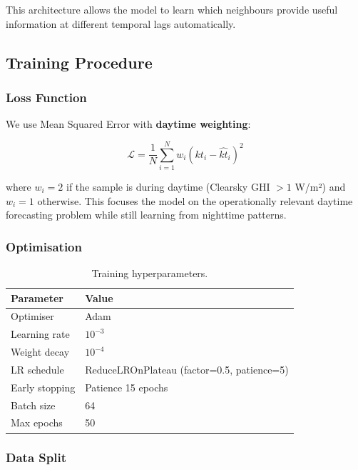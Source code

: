 \documentclass[11pt,a4paper]{article}
\begin{document}
This architecture allows the model to learn which neighbours provide useful information at different temporal lags automatically.

\subsection{Training Procedure}

\subsubsection{Loss Function}

We use Mean Squared Error with \textbf{daytime weighting}:

\begin{equation}
    \mathcal{L} = \frac{1}{N} \sum_{i=1}^{N} w_i (kt_i - \hat{kt}_i)^2
\end{equation}

where $w_i = 2$ if the sample is during daytime (Clearsky GHI $> 1$ W/m²) and $w_i = 1$ otherwise. This focuses the model on the operationally relevant daytime forecasting problem while still learning from nighttime patterns.

\subsubsection{Optimisation}

\begin{table}[H]
\centering
\caption{Training hyperparameters.}
\label{tab:training}
\begin{tabular}{ll}
\toprule
\textbf{Parameter} & \textbf{Value} \\
\midrule
Optimiser & Adam \\
Learning rate & $10^{-3}$ \\
Weight decay & $10^{-4}$ \\
LR schedule & ReduceLROnPlateau (factor=0.5, patience=5) \\
Early stopping & Patience 15 epochs \\
Batch size & 64 \\
Max epochs & 50 \\
\bottomrule
\end{tabular}
\end{table}

\subsubsection{Data Split}
\end{document}
